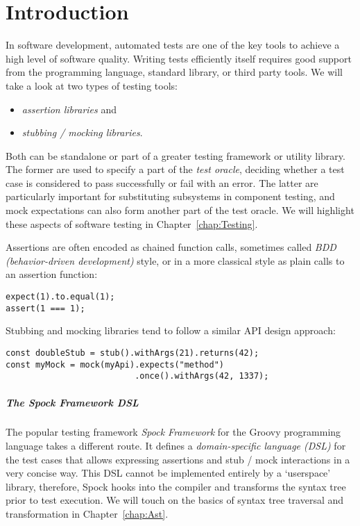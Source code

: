 \chapter{Introduction}
In software development, automated tests are one of the key tools
to achieve a high level of software quality.
Writing tests efficiently itself requires good support
from the programming language, standard library, or third party tools.
We will take a look at two types of testing tools:
\begin{itemize}
  \item \textit{assertion libraries} and
  \item \textit{stubbing / mocking libraries}.
\end{itemize}
Both can be standalone or part of a greater testing framework or utility library.
The former are used to specify a part of the \textit{test oracle},
deciding whether a test case is considered to pass successfully or fail with an error.
The latter are particularly important for substituting subsystems in component testing,
and mock expectations can also form another part of the test oracle.
We will highlight these aspects of software testing in Chapter~\ref{chap:Testing}.

Assertions are often encoded as chained function calls,
sometimes called \textit{BDD (behavior-driven development)} style,
or in a more classical style as plain calls to an assertion function:
\autocite{ChaiBddDoc}\autocite{ChaiTddDoc}
\begin{verbatim}
expect(1).to.equal(1);
assert(1 === 1);
\end{verbatim}
Stubbing and mocking libraries tend to follow a similar API design approach:
\autocite{SinonStubDoc}\autocite{SinonMockDoc}
\begin{verbatim}
const doubleStub = stub().withArgs(21).returns(42);
const myMock = mock(myApi).expects("method")
                          .once().withArgs(42, 1337);
\end{verbatim}

\paragraph{The Spock Framework DSL}
The popular testing framework \textit{Spock Framework}
for the Groovy programming language takes a different route.
It defines a \textit{domain-specific language (DSL)} for the test cases
that allows expressing assertions and stub / mock interactions in a very concise way.
This DSL cannot be implemented entirely by a `userspace' library, therefore,
Spock hooks into the compiler and transforms the syntax tree prior to test execution.
We will touch on the basics of
syntax tree traversal and transformation
in Chapter~\ref{chap:Ast}.

